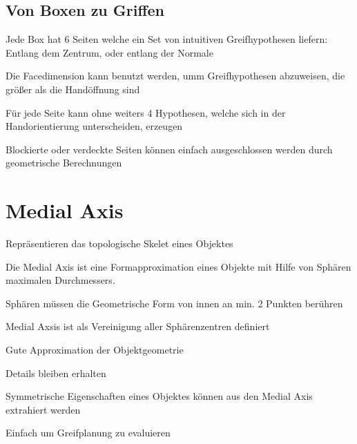 \subsection{Von Boxen zu Griffen}
\item Jede Box hat 6 Seiten welche ein Set von intuitiven Greifhypothesen liefern:
Entlang dem Zentrum, oder entlang der Normale
\item Die Facedimension kann benutzt werden, umm Greifhypothesen abzuweisen, die
größer als die Handöffnung sind
\item Für jede Seite kann ohne weiters 4 Hypothesen, welche sich in der Handorientierung
unterscheiden, erzeugen
\item Blockierte oder verdeckte Seiten können einfach ausgeschlossen werden durch
geometrische Berechnungen

\section{Medial Axis}
\begin{compactitem}
    \item Repräsentieren das topologische Skelet eines Objektes
    \item Die Medial Axis ist eine Formapproximation eines Objekte mit Hilfe von
     Sphären maximalen Durchmessers.
    \item Sphären müssen die Geometrische Form von innen an min. 2 Punkten berühren
    \item Medial Axsis ist als Vereinigung aller Sphärenzentren definiert

\end{compactitem}
\begin{compactitem}
    \item Gute Approximation der Objektgeometrie
    \item Details bleiben erhalten
    \item Symmetrische Eigenschaften eines Objektes können aus den Medial Axis
    extrahiert werden
    \item Einfach um Greifplanung zu evaluieren
\end{compactitem}

